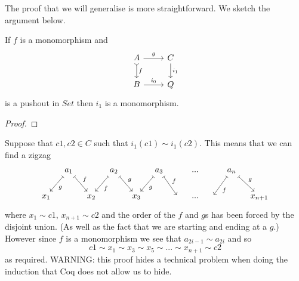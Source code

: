 \documentclass{article}
\begin{document}
The proof that we will generalise is more straightforward.
We sketch the argument below.

\begin{lemma}\label{lem:pushout-of-mono-2}
  If $f$ is a monomorphism and
  \begin{equation*}
    \begin{tikzcd}
     A \rar{g} \dar[rightarrowtail]{f} & C\dar{i_1}\\
     B \rar{i_0} & Q
    \end{tikzcd}
  \end{equation*}
  is a pushout in $Set$ then $i_1$ is a monomorphism.
  \begin{proof}

  \end{proof}
  Suppose that $c1,c2\in C$ such that $i_1(c1)\sim i_1(c2)$.
  This means that we can find a zigzag
  \begin{equation*}
    \begin{tikzcd}[column sep=0.3cm]
      {} & a_1 \dlar[mapsto]{g} \drar[mapsto]{f} & {} & a_2 \dlar[mapsto]{f} \drar[mapsto]{g}& {} & a_3 \dlar[mapsto]{g}\drar[mapsto]{f} &{} &...& & a_n \dlar[mapsto]{f}\drar[mapsto]{g} &{} \\
      x_1 & {} & x_2 & {} & x_3 & {} & {} & ...& {}  & {} & x_{n+1}
    \end{tikzcd}
  \end{equation*}
  where $x_1\sim c1$, $x_{n+1}\sim c2$ and the order of the $f$ and $g$s has been forced by the disjoint union.
  (As well as the fact that we are starting and ending at a $g$.)
  However since $f$ is a monomorphism we see that $a_{2i-1}\sim a_{2i}$ and so
  \begin{equation*}
    c1 \sim x_1 \sim x_3 \sim x_5 \sim ... \sim x_{n+1}\sim c2
  \end{equation*}
  as required.
  WARNING: this proof hides a technical problem when doing the induction that Coq does not allow us to hide.
\end{lemma}
\end{document}
